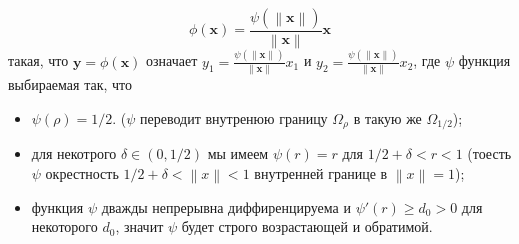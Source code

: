 \documentclass[a4paper, 12pt]{article}
\newcommand{\norm}[1]{\left\lVert#1\right\rVert}
\begin{document}
\begin{equation}\label{e37}
\phi(\textbf{x}) = \frac{\psi(\norm{\textbf{x}})}{\norm{\textbf{x}}}\textbf{x}
\end{equation} 
такая, что $\textbf{y} = \phi(\textbf{x})$ означает $y_1 = \frac{\psi(\norm{\textbf{x}})}
{\norm{\textbf{x}}}x_1$ и $y_2 = \frac{\psi(\norm{\textbf{x}})}
{\norm{\textbf{x}}}x_2$, где $\psi$ функция выбираемая так, что
\begin{itemize}
\item $\psi(\rho) = 1/2$. ($\psi$ переводит внутренюю границу $\Omega_{\rho}$ в такую же $\Omega_{1/2}$);
\item для некотрого $\delta \in (0, 1/2)$  мы имеем $\psi(r) = r$ для $1/2 + \delta < r < 1$ (тоесть $\psi$
окрестность $1/2 + \delta < \norm{x} < 1$ внутренней границе в $\norm{x} = 1$);
\item функция $\psi$ дважды непрерывна диффиренцируема и $\psi'(r) \geq d_0 > 0$ для некоторого $d_0$, значит $\psi$ будет строго возрастающей и обратимой.
\end{itemize}
\end{document}

